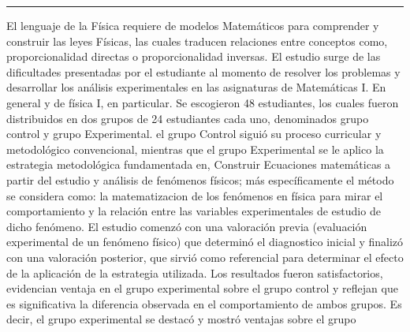 \begin{titlepage}
\begin{minipage}{0.5\linewidth}
\begin{minipage}{0.45\linewidth}
    \begin{flushright}
        \printauthor
    \end{flushright}
\end{minipage} \hspace{-3pt}
%
\begin{minipage}{0.02\linewidth}
   \color{ptctitle} \rule{1pt}{245pt}
\end{minipage} 
\end{minipage}
\hspace*{-4.5cm}
\begin{minipage}{0.85\linewidth}
\begin{minipage}{0.85\linewidth}
\footnotesize
\vspace{5pt}
    \begin{resumen}
   El lenguaje de la F\'isica requiere de modelos Matem\'aticos para comprender y
construir las leyes F\'isicas, las cuales traducen relaciones entre conceptos
como, proporcionalidad directas o proporcionalidad inversas. El estudio surge
de las dificultades presentadas por el estudiante al momento de resolver los
problemas y desarrollar los an\'alisis experimentales en las asignaturas de
Matem\'aticas I. En general y de f\'isica I, en particular. Se escogieron 48
estudiantes, los cuales fueron distribuidos en dos grupos de 24 estudiantes
cada uno, denominados grupo control y grupo Experimental. el grupo Control
sigui\'o su proceso curricular y metodol\'ogico convencional, mientras que el
grupo Experimental se le aplico la estrategia metodol\'ogica fundamentada en,
Construir Ecuaciones matem\'aticas a partir del estudio y an\'alisis de fen\'omenos
f\'isicos; m\'as espec\'ificamente el m\'etodo se considera como: la matematizacion de
los fen\'omenos en f\'isica para mirar el comportamiento y la relaci\'on entre las
variables experimentales de estudio de dicho fen\'omeno. El estudio comenz\'o con
una valoraci\'on previa (evaluaci\'on experimental de un fen\'omeno f\'isico) que
determin\'o el diagnostico inicial y finaliz\'o con una valoraci\'on posterior, que
sirvi\'o como referencial para determinar el efecto de la aplicaci\'on de la
estrategia utilizada. Los resultados fueron satisfactorios, evidencian ventaja
en el grupo experimental sobre el grupo control y reflejan que es
significativa la diferencia observada en el comportamiento de ambos grupos. Es
decir, el grupo experimental se destac\'o y mostr\'o ventajas sobre el grupo

\end{resumen}
\end{minipage}
\end{minipage}
\end{titlepage}
